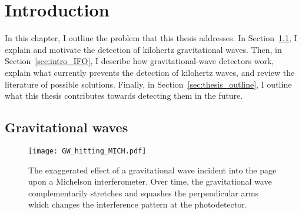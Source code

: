 \chapter{Introduction} %
\label{chp:introduction}





In this chapter, I outline the problem that this thesis addresses. In Section~\ref{sec:gravWaves}, I explain and motivate the detection of kilohertz gravitational waves. Then, in Section~\ref{sec:intro_IFO}, I describe how gravitational-wave detectors work, explain what currently prevents the detection of kilohertz waves, and review the literature of possible solutions. Finally, in Section~\ref{sec:thesis_outline}, I outline what this thesis contributes towards detecting them in the future.


\section{Gravitational waves}
\label{sec:gravWaves}

\begin{figure}
	\centering
	\texttt{[image: GW\_hitting\_MICH.pdf]}
	\caption{The exaggerated effect of a gravitational wave incident into the page upon a Michelson interferometer. Over time, the gravitational wave complementarily stretches and squashes the perpendicular arms which changes the interference pattern at the photodetector.}
	\label{fig:GW_incident_Michelson}
\end{figure}

